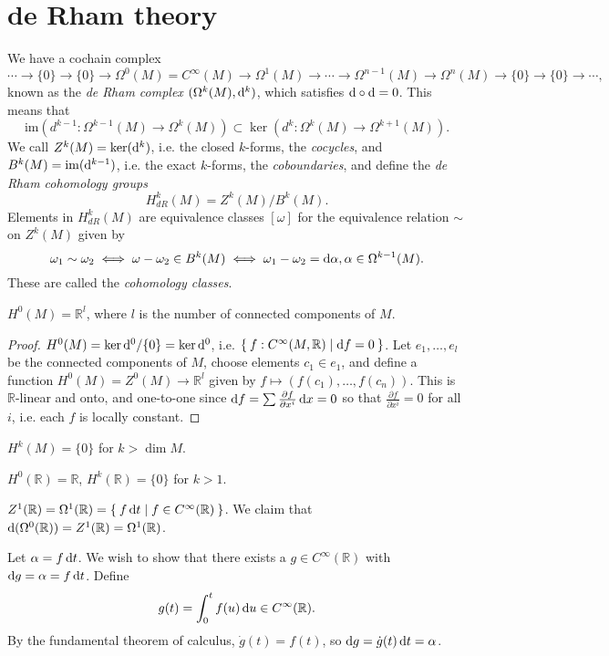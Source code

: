 \section{de Rham theory}
We have a cochain complex
$$
\cdots \to \{ 0 \} \to \{ 0 \} \to
\Omega^0(M) = C^\infty(M) \to
\Omega^1(M) \to \cdots \to
\Omega^{n-1}(M) \to
\Omega^n(M) \to
\{0\} \to \{0\} \to \cdots,
$$
known as the \emph{de Rham complex}
$(\Omega^k(M), \mathop{}\!\mathrm{d}^k)$, which satisfies $\mathop{}\!\mathrm{d} \circ \mathop{}\!\mathrm{d} = 0$.
This means that
$$
        \mathrm{im}(d^{k-1}: \Omega^{k-1}(M) \to \Omega^k(M))
\subset \ker(d^k : \Omega^k(M) \to \Omega^{k+1}(M)).
$$
We call $Z^k(M) = \ker(\mathop{}\!\mathrm{d}^k)$, i.e. the closed $k$-forms,
the \emph{cocycles}, and $B^k(M) = \mathrm{im}(\mathop{}\!\mathrm{d}^{k-1})$, i.e. the
exact $k$-forms, the \emph{coboundaries}, and define the
\emph{de Rham cohomology groups}
$$
  H^k_{dR}(M)
= Z^k(M) / B^k(M).
$$
Elements in $H^k_{dR}(M)$ are equivalence classes $[\omega]$ for the
equivalence relation $\sim$ on $Z^k(M)$ given by
$$
     \omega_1 \sim \omega_2
\iff \omega - \omega_2 \in B^k(M)
\iff \omega_1 - \omega_2 = \mathop{}\!\mathrm{d} \alpha, \alpha \in \Omega^{k-1}(M).
$$
These are called the \emph{cohomology classes}.

\begin{prop}
$H^0(M) = \mathbb{R}^l$, where $l$ is the number of connected
components of $M$.
\end{prop}

\begin{proof}
$H^0(M) = \ker \mathop{}\!\mathrm{d}^0 / \{ 0 \} = \ker \mathop{}\!\mathrm{d}^0$, i.e.
$\Set{ f : C^\infty(M, \mathbb{R}) | \mathop{}\!\mathrm{d}f = 0 }$.
Let $e_1, \dots, e_l$ be the connected components of $M$,
choose elements $c_1 \in e_1$, and define a function
$H^0(M) = Z^0(M) \to \mathbb{R}^l$ given by
$f \mapsto (f(c_1), \dots, f(c_n))$. This is $\mathbb{R}$-linear and
onto, and one-to-one since
$\mathop{}\!\mathrm{d} f = \sum \frac{\partial f}{\partial x^i} \mathop{}\!\mathrm{d} x = 0$ so that
$\frac{\partial f}{\partial x^i} = 0$ for all $i$, i.e. each
$f$ is locally constant.
\end{proof}

\begin{remark}
$H^k(M) = \{ 0 \}$ for $k > \dim M$.
\end{remark}

\begin{xmpl}
$H^0(\mathbb{R}) = \mathbb{R}$, $H^k(\mathbb{R}) = \{ 0 \}$ for $k >
1$.

$Z^1(\mathbb{R}) = \Omega^1(\mathbb{R}) = \Set{ f \mathop{}\!\mathrm{d}t | f \in
C^\infty(\mathbb{R})}$.
We claim that $\mathop{}\!\mathrm{d}(\Omega^0(\mathbb{R})) = Z^1(\mathbb{R}) =
\Omega^1(\mathbb{R})$.

Let $\alpha = f \mathop{}\!\mathrm{d} t$. We wish to show that there exists a
$g \in C^\infty(\mathbb{R})$ with $\mathop{}\!\mathrm{d} g = \alpha = f \mathop{}\!\mathrm{d} t$.
Define
$$
  g(t)
= \int_0^t
    f(u) \mathop{}\!\mathrm{d} u
\in C^\infty(\mathbb{R}).
$$
By the fundamental theorem of calculus, $\dot{g}(t) = f(t)$, so
$\mathop{}\!\mathrm{d} g = \dot{g}(t) \mathop{}\!\mathrm{d} t = \alpha$.
\end{xmpl}

